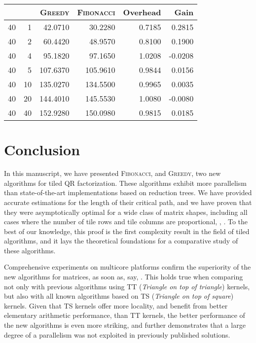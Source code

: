 \documentclass[a4paper,twopages]{article}
\newcommand{\MC}{\textsc{Fibonacci}\xspace}
\newcommand{\Greedy}{\textsc{Greedy}\xspace}
\begin{document}
\begin{table*}
    \centering
    \begin{tabular}{|r|r|r||r|r|r|}
         \hline
          &   & \Greedy &    \MC & Overhead &   Gain\\
         \hline
        40 &  1 &   42.0710 &  30.2280  &   0.7185 & 0.2815\\
        40 &  2 &   60.4420 &  48.9570  &   0.8100 & 0.1900\\
        40 &  4 &   95.1820 &  97.1650  &   1.0208 &-0.0208\\
        40 &  5 &  107.6370 & 105.9610  &   0.9844 & 0.0156\\
        40 & 10 &  135.0270 & 134.5500  &   0.9965 & 0.0035\\
        40 & 20 &  144.4010 & 145.5530  &   1.0080 &-0.0080\\
        40 & 40 &  152.9280 & 150.0980  &   0.9815 & 0.0185\\
         \hline
    \end{tabular}
    \caption{\Greedy versus \MC (Experimental Double Complex)}
\end{table*}





\section{Conclusion}
\label{sec.conclusion}

In this manuscript, we have presented \MC, and \Greedy, two new algorithms for tiled QR factorization.
These algorithms exhibit more parallelism than state-of-the-art implementations
based on reduction trees. We have provided accurate estimations for the length of their critical path,
and we have proven that they were asymptotically optimal for a wide class of matrix shapes, including
all cases where the number of tile rows  and tile columns  are proportional, , .
To the best of our knowledge, this proof is the first complexity result in the field of tiled algorithms,
and it lays the theoretical foundations for a comparative study of these algorithms.

Comprehensive experiments on multicore platforms confirm the superiority of the new algorithms for  matrices,
as soon as, say, .
This holds true when comparing not only with previous algorithms using TT (\emph{Triangle on top of triangle}) kernels, but also
with all known algorithms based on TS (\emph{Triangle on top of square}) kernels. Given that TS kernels offer more locality, and
benefit from better elementary arithmetic performance, than TT kernels, the better performance of the new algorithms is
even more striking, and further demonstrates that a large degree of a parallelism was not exploited in previously published solutions.
\end{document}
